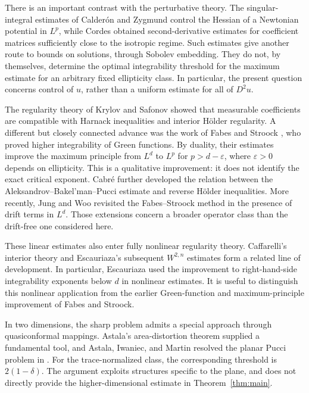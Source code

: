 \documentclass[11pt,a4paper,reqno]{amsart}
\theoremstyle{plain}
\theoremstyle{remark}
\numberwithin{equation}{section}
\begin{document}
There is an important contrast with the perturbative theory. The singular-integral estimates of Calder\'on and Zygmund \cite{CZ1952} control the Hessian of a Newtonian potential in $L^p$, while Cordes \cite{Cordes1956} obtained second-derivative estimates for coefficient matrices sufficiently close to the isotropic regime. Such estimates give another route to bounds on solutions, through Sobolev embedding. They do not, by themselves, determine the optimal integrability threshold for the maximum estimate for an arbitrary fixed ellipticity class. In particular, the present question concerns control of $u$, rather than a uniform estimate for all of $D^2u$.

The regularity theory of Krylov and Safonov \cite{KrylovSafonov1980} showed that measurable coefficients are compatible with Harnack inequalities and interior H\"older regularity. A different but closely connected advance was the work of Fabes and Stroock \cite{FabesStroock1984}, who proved higher integrability of Green functions. By duality, their estimates improve the maximum principle from $L^d$ to $L^p$ for $p>d-\varepsilon$, where $\varepsilon>0$ depends on ellipticity. This is a qualitative improvement: it does not identify the exact critical exponent. Cabr\'e \cite{Cabre1995} further developed the relation between the Aleksandrov--Bakel'man--Pucci estimate and reverse H\"older inequalities. More recently, Jung and Woo \cite{JungWoo2025} revisited the Fabes--Stroock method in the presence of drift terms in $L^d$. Those extensions concern a broader operator class than the drift-free one considered here.

These linear estimates also enter fully nonlinear regularity theory. Caffarelli's interior theory \cite{Caffarelli1989} and Escauriaza's subsequent $W^{2,n}$ estimates \cite{Escauriaza1993} form a related line of development. In particular, Escauriaza used the improvement to right-hand-side integrability exponents below $d$ in nonlinear estimates. It is useful to distinguish this nonlinear application from the earlier Green-function and maximum-principle improvement of Fabes and Stroock.

In two dimensions, the sharp problem admits a special approach through quasiconformal mappings. Astala's area-distortion theorem \cite{Astala1994} supplied a fundamental tool, and Astala, Iwaniec, and Martin resolved the planar Pucci problem in \cite[Theorem~3.5]{AIM2006}. For the trace-normalized class, the corresponding threshold is $2(1-\delta)$. The argument exploits structures specific to the plane, and does not directly provide the higher-dimensional estimate in Theorem~\ref{thm:main}.
\end{document}
